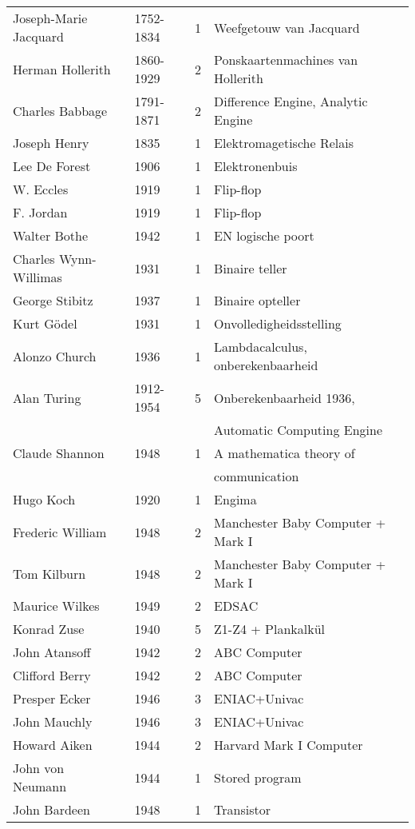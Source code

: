 \documentclass[../main.tex]{subfiles}
\begin{document}
\begin{longtable}{llll}
Joseph-Marie Jacquard	&	1752-1834	&	1		&	Weefgetouw van Jacquard	\\
Herman Hollerith		&	1860-1929	&	2		&	Ponskaartenmachines van Hollerith	\\
Charles Babbage			&	1791-1871	&	2		&	Difference Engine, Analytic Engine	\\
Joseph Henry			&	1835		&	1		&	Elektromagetische Relais	\\
Lee De Forest			&	1906		&	1		&	Elektronenbuis	\\
W. Eccles				&	1919		&	1		&	Flip-flop	\\
F. Jordan				&	1919		&	1		&	Flip-flop	\\
Walter Bothe			&	1942		&	1		&	EN logische poort	\\
Charles Wynn-Willimas	&	1931		&	1		&	Binaire teller	\\
George Stibitz			&	1937		&	1		&	Binaire opteller	\\
Kurt Gödel				&	1931		&	1		&	Onvolledigheidsstelling	\\
Alonzo Church			&	1936		&	1		&	Lambdacalculus, onberekenbaarheid	\\
Alan Turing				&	1912-1954	&	5		&	Onberekenbaarheid 1936, 	\\
					 	&				&			&	Automatic Computing Engine \\
Claude Shannon			&	1948		&	1		&	A mathematica theory of 	\\
					 	&				&			&	communication \\
Hugo Koch				&	1920		&	1		&	Engima	\\
Frederic William		&	1948		&	2		&	Manchester Baby Computer + Mark I	\\
Tom Kilburn				&	1948		&	2		&	Manchester Baby Computer + Mark I	\\
Maurice Wilkes			&	1949		&	2		&	EDSAC	\\
Konrad Zuse				&	1940		&	5		&	Z1-Z4 + Plankalkül	\\
John Atansoff			&	1942		&	2		&	ABC Computer	\\
Clifford Berry			&	1942		&	2		&	ABC Computer	\\
Presper Ecker			&	1946		&	3		&	ENIAC+Univac	\\
John Mauchly			&	1946		&	3		&	ENIAC+Univac	\\
Howard Aiken			&	1944		&	2		&	Harvard Mark I Computer	\\
John von Neumann		&	1944		&	1		&	Stored program	\\
John Bardeen			&	1948		&	1		&	Transistor	\\

\end{longtable}
\end{document}
